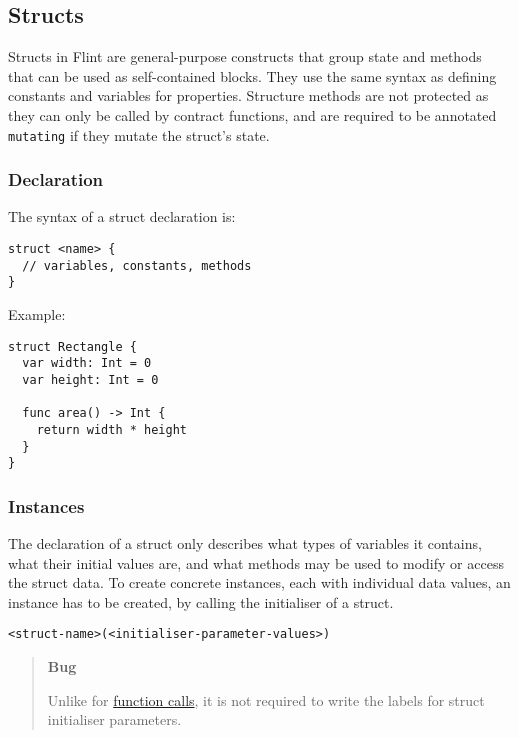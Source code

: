 \subsection{Structs}
\label{sec:appendix-b-structs}

Structs in Flint are general-purpose constructs that group state and methods that can be used as self-contained blocks. They use the same syntax as defining constants and variables for properties. Structure methods are not protected as they can only be called by contract functions, and are required to be annotated \texttt{mutating} if they mutate the struct's state.

\subsubsection{Declaration}
\label{sec:appendix-b-declaration}

The syntax of a struct declaration is:

\begin{verbatim}
struct <name> {
  // variables, constants, methods
}
\end{verbatim}

Example:

\begin{verbatim}
struct Rectangle {
  var width: Int = 0
  var height: Int = 0

  func area() -> Int {
    return width * height
  }
}
\end{verbatim}

\subsubsection{Instances}
\label{sec:appendix-b-instances}

The declaration of a struct only describes what types of variables it contains, what their initial values are, and what methods may be used to modify or access the struct data. To create concrete instances, each with individual data values, an instance has to be created, by calling the initialiser of a struct.

\begin{verbatim}
<struct-name>(<initialiser-parameter-values>)
\end{verbatim}

\begin{quote}
\textbf{Bug}

Unlike for \hyperref[sec:appendix-b-function-calls]{function calls}, it is not required to write the labels for struct initialiser parameters.
\end{quote}

